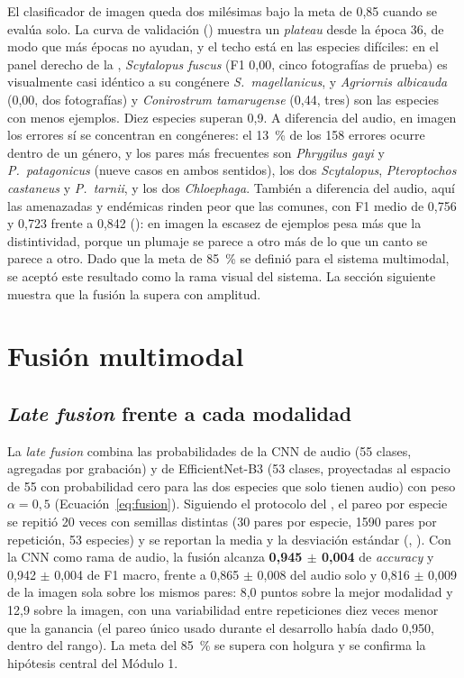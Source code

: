 El clasificador de imagen queda dos milésimas bajo la meta de 0,85 cuando se
evalúa solo. La curva de validación () muestra un
\textit{plateau} desde la época 36, de modo que más épocas no ayudan, y el
techo está en las especies difíciles: en el panel derecho de la
, \textit{Scytalopus fuscus} (F1 0,00, cinco
fotografías de prueba) es visualmente casi idéntico a su congénere
\textit{S.~magellanicus}, y \textit{Agriornis albicauda} (0,00, dos
fotografías) y \textit{Conirostrum tamarugense} (0,44, tres) son las especies
con menos ejemplos. Diez especies superan 0,9. A diferencia del audio, en
imagen los errores sí se concentran en congéneres: el \SI{13}{\percent} de los
158 errores ocurre dentro de un género, y los pares más frecuentes son
\textit{Phrygilus gayi} y \textit{P.~patagonicus} (nueve casos en ambos
sentidos), los dos \textit{Scytalopus}, \textit{Pteroptochos castaneus} y
\textit{P.~tarnii}, y los dos \textit{Chloephaga}. También a diferencia del
audio, aquí las amenazadas y endémicas rinden peor que las comunes, con F1
medio de 0,756 y 0,723 frente a 0,842 (): en imagen la
escasez de
ejemplos pesa más que la distintividad, porque un plumaje se parece a otro
más de lo que un canto se parece a otro. Dado que la meta de
\SI{85}{\percent} se definió para el sistema multimodal, se aceptó este
resultado como la rama visual del sistema. La sección siguiente muestra que
la fusión la supera con amplitud.

\section{Fusión multimodal}\label{sec:res-fusion}

\subsection{\textit{Late fusion} frente a cada modalidad}

La \textit{late fusion} combina las probabilidades de la CNN de audio (55 clases,
agregadas por grabación) y de EfficientNet-B3 (53 clases, proyectadas al
espacio de 55 con probabilidad cero para las dos especies que solo tienen audio) con
peso $\alpha = 0{,}5$ (Ecuación~\ref{eq:fusion}). Siguiendo el protocolo del
, el pareo por especie se repitió 20 veces con semillas
distintas (30 pares por especie, \num{1590} pares por repetición, 53
especies) y se reportan la media y la desviación estándar
(, ). Con la CNN como rama
de audio, la fusión alcanza \textbf{0,945 $\pm$ 0,004} de \textit{accuracy} y
0,942 $\pm$ 0,004 de F1 macro, frente a 0,865 $\pm$ 0,008 del audio solo y
0,816 $\pm$ 0,009 de la imagen sola sobre los mismos pares: 8,0 puntos sobre
la mejor modalidad y 12,9 sobre la imagen, con una variabilidad entre
repeticiones diez veces menor que la ganancia (el pareo único usado durante
el desarrollo había dado 0,950, dentro del rango). La meta del
\SI{85}{\percent} se supera con holgura y se confirma la hipótesis central
del Módulo 1.

